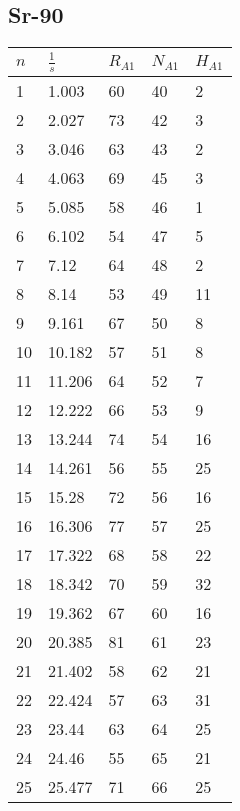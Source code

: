 \documentclass{article}
\begin{document}
		\subsection*{Sr-90}
			\begin{longtable}{@{}lllll@{}}
				\toprule
				$n$   & $\frac{1}{s}$     & $R_{A1}$ & $N_{A1}$ & $H_{A1}$ \\* \midrule
				\endfirsthead
				\endhead
				\bottomrule
				\endfoot
				\endlastfoot
				1   & 1.003   & 60    & 40    & 2     \\
				2   & 2.027   & 73    & 42    & 3     \\
				3   & 3.046   & 63    & 43    & 2     \\
				4   & 4.063   & 69    & 45    & 3     \\
				5   & 5.085   & 58    & 46    & 1     \\
				6   & 6.102   & 54    & 47    & 5     \\
				7   & 7.12    & 64    & 48    & 2     \\
				8   & 8.14    & 53    & 49    & 11    \\
				9   & 9.161   & 67    & 50    & 8     \\
				10  & 10.182  & 57    & 51    & 8     \\
				11  & 11.206  & 64    & 52    & 7     \\
				12  & 12.222  & 66    & 53    & 9     \\
				13  & 13.244  & 74    & 54    & 16    \\
				14  & 14.261  & 56    & 55    & 25    \\
				15  & 15.28   & 72    & 56    & 16    \\
				16  & 16.306  & 77    & 57    & 25    \\
				17  & 17.322  & 68    & 58    & 22    \\
				18  & 18.342  & 70    & 59    & 32    \\
				19  & 19.362  & 67    & 60    & 16    \\
				20  & 20.385  & 81    & 61    & 23    \\
				21  & 21.402  & 58    & 62    & 21    \\
				22  & 22.424  & 57    & 63    & 31    \\
				23  & 23.44   & 63    & 64    & 25    \\
				24  & 24.46   & 55    & 65    & 21    \\
				25  & 25.477  & 71    & 66    & 25    \\

\end{longtable}
\end{document}
